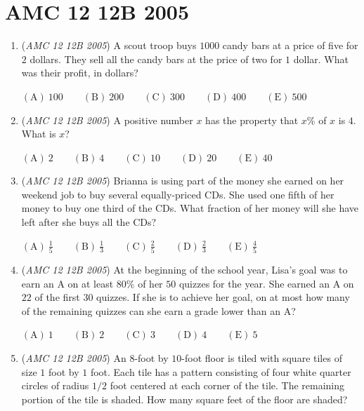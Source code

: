 \section{AMC 12 12B 2005}
        \begin{enumerate}
        	\item (\textit{AMC 12 12B 2005}) A scout troop buys $1000$ candy bars at a price of five for $2$ dollars. They sell all the candy bars at the price of two for $1$ dollar.  What was their profit, in dollars?


 $\mathrm{(A)}\ 100      \qquad \mathrm{(B)}\ 200      \qquad \mathrm{(C)}\ 300      \qquad \mathrm{(D)}\ 400      \qquad \mathrm{(E)}\ 500$


	\item (\textit{AMC 12 12B 2005}) A positive number $x$ has the property that $x\%$ of $x$ is $4$.  What is $x$?


 $\mathrm{(A)}\ 2      \qquad \mathrm{(B)}\ 4      \qquad \mathrm{(C)}\ 10      \qquad \mathrm{(D)}\ 20      \qquad \mathrm{(E)}\ 40$


	\item (\textit{AMC 12 12B 2005}) Brianna is using part of the money she earned on her weekend job to buy several equally-priced CDs. She used one fifth of her money to buy one third of the CDs. What fraction of her money will she have left after she buys all the CDs? 


 $\mathrm{(A)}\ \frac15      \qquad \mathrm{(B)}\ \frac13      \qquad \mathrm{(C)}\ \frac25      \qquad \mathrm{(D)}\ \frac23      \qquad \mathrm{(E)}\ \frac45$


	\item (\textit{AMC 12 12B 2005}) At the beginning of the school year, Lisa's goal was to earn an A on at least $80\%$ of her $50$ quizzes for the year.  She earned an A on $22$ of the first $30$ quizzes.  If she is to achieve her goal, on at most how many of the remaining quizzes can she earn a grade lower than an A?


 $\mathrm{(A)}\ 1      \qquad \mathrm{(B)}\ 2      \qquad \mathrm{(C)}\ 3      \qquad \mathrm{(D)}\ 4      \qquad \mathrm{(E)}\ 5$


	\item (\textit{AMC 12 12B 2005}) An $8$-foot by $10$-foot floor is tiled with square tiles of size $1$ foot by $1$ foot.  Each tile has a pattern consisting of four white quarter circles of radius $1/2$ foot centered at each corner of the tile.  The remaining portion of the tile is shaded.  How many square feet of the floor are shaded?



\end{enumerate}
